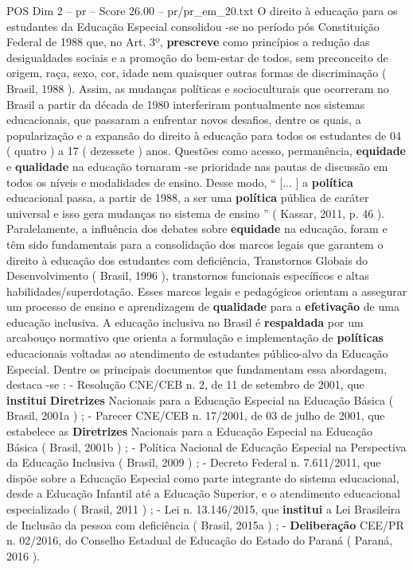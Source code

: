\begin{textsample}{POS Dim 2 – pr – Score 26.00 – pr/pr\_em\_20.txt}  \label{ex:f2_pos_117}
O direito à educação para os estudantes da Educação Especial consolidou -se no período pós Constituição Federal de 1988 que, no Art. 3º, \textbf{prescreve} como princípios a redução das desigualdades sociais e a promoção do bem-estar de todos, sem preconceito de origem, raça, sexo, cor, idade nem quaisquer outras formas de discriminação ( Brasil, 1988 ).
Assim, as mudanças políticas e socioculturais que ocorreram no Brasil a partir da década de 1980 interferiram pontualmente nos sistemas educacionais, que passaram a enfrentar novos desafios, dentre os quais, a popularização e a expansão do direito à educação para todos os estudantes de 04 ( quatro ) a 17 ( dezessete ) anos.
Questões como acesso, permanência, \textbf{equidade} e \textbf{qualidade} na educação tornaram -se prioridade nas pautas de discussão em todos os níveis e modalidades de ensino.
Desse modo, “ [... ] a \textbf{política} educacional passa, a partir de 1988, a ser uma \textbf{política} pública de caráter universal e isso gera mudanças no sistema de ensino ” ( Kassar, 2011, p. 46 ).
Paralelamente, a influência dos debates sobre \textbf{equidade} na educação, foram e têm sido fundamentais para a consolidação dos marcos legais que garantem o direito à educação dos estudantes com deficiência, Transtornos Globais do Desenvolvimento ( Brasil, 1996 ), transtornos funcionais específicos e altas habilidades/superdotação.
Esses marcos legais e pedagógicos orientam a assegurar um processo de ensino e aprendizagem de \textbf{qualidade} para a \textbf{efetivação} de uma educação inclusiva.
A educação inclusiva no Brasil é \textbf{respaldada} por um arcabouço normativo que orienta a formulação e implementação de \textbf{políticas} educacionais voltadas ao atendimento de estudantes público-alvo da Educação Especial.
Dentre os principais documentos que fundamentam essa abordagem, destaca -se : - Resolução CNE/CEB n. 2, de 11 de setembro de 2001, que \textbf{institui} \textbf{Diretrizes} Nacionais para a Educação Especial na Educação Básica ( Brasil, 2001a ) ; - Parecer CNE/CEB n. 17/2001, de 03 de julho de 2001, que estabelece as \textbf{Diretrizes} Nacionais para a Educação Especial na Educação Básica ( Brasil, 2001b ) ; - Política Nacional de Educação Especial na Perspectiva da Educação Inclusiva ( Brasil, 2009 ) ; - Decreto Federal n. 7.611/2011, que dispõe sobre a Educação Especial como parte integrante do sistema educacional, desde a Educação Infantil até a Educação Superior, e o atendimento educacional especializado ( Brasil, 2011 ) ; - Lei n. 13.146/2015, que \textbf{institui} a Lei Brasileira de Inclusão da pessoa com deficiência ( Brasil, 2015a ) ; - \textbf{Deliberação} CEE/PR n. 02/2016, do Conselho Estadual de Educação do Estado do Paraná ( Paraná, 2016 ).

\end{textsample}

